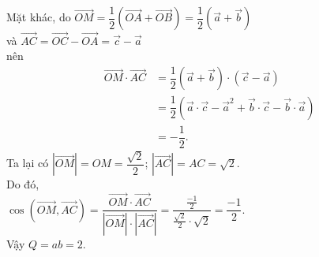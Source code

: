 \begin{ex}
{{		}
		\noindent
		Mặt khác, do $\overrightarrow{OM}=\dfrac{1}{2}\left(\overrightarrow{OA}+\overrightarrow{OB}\right)=\dfrac{1}{2}\left(\vec{a}+\vec{b}\right)$\\
		và $\overrightarrow{AC}=\overrightarrow{OC}-\overrightarrow{OA}=\vec{c}-\vec{a}$ \\
		nên 
		\begin{eqnarray*}
			& \overrightarrow{OM} \cdot \overrightarrow{AC} & =\dfrac{1}{2} \left( \vec{a} +\vec{b} \right) \cdot \left( \vec{c}-\vec{a} \right) \\
			& & =\dfrac{1}{2}\left(\vec{a}\cdot\vec{c}-\vec{a}^2+\vec{b}\cdot\vec{c}-\vec{b}\cdot\vec{a}\right) \\
			& & = -\dfrac{1}{2}.
		\end{eqnarray*}
		Ta lại có $\left| \overrightarrow{OM} \right|=OM=\dfrac{\sqrt{2}}{2}$; $\left| \overrightarrow{AC} \right|=AC=\sqrt{2}$.\\
		Do đó, \\
		$\cos \left( \overrightarrow{OM},\overrightarrow{AC} \right) =\dfrac{\overrightarrow{OM} \cdot \overrightarrow{AC}}{\left| \overrightarrow{OM} \right| \cdot \left| \overrightarrow{AC} \right|} =\dfrac{\tfrac{-1}{2}}{\tfrac{\sqrt{2}}{2} \cdot \sqrt{2}}=\dfrac{-1}{2}$.\\
		Vậy $ Q=ab=2$.}
\end{ex}

